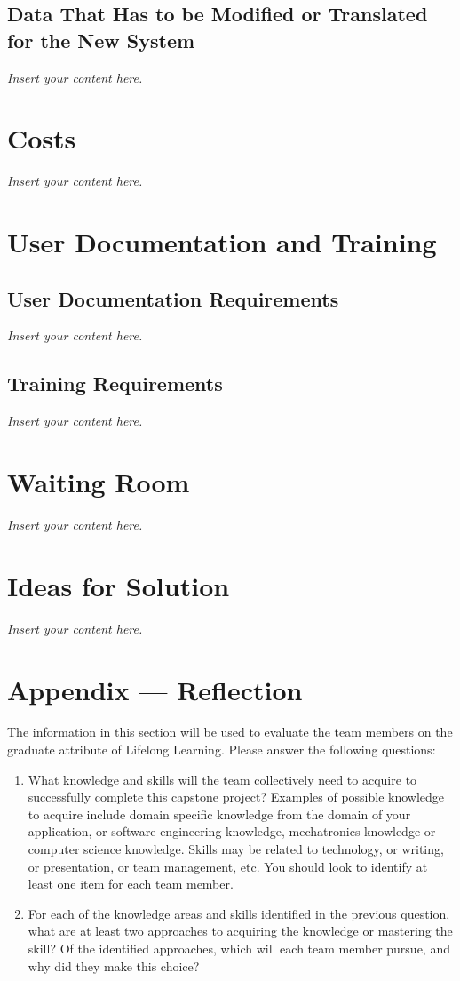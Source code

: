 \documentclass[12pt]{article}
\newcommand{\lips}{\textit{Insert your content here.}}
\begin{document}
\subsection{Data That Has to be Modified or Translated for the New System}
\lips

\section{Costs}
\lips
\section{User Documentation and Training}
\subsection{User Documentation Requirements}
\lips
\subsection{Training Requirements}
\lips

\section{Waiting Room}
\lips

\section{Ideas for Solution}
\lips

\newpage{}
\section*{Appendix --- Reflection}

The information in this section will be used to evaluate the team members on the
graduate attribute of Lifelong Learning.  Please answer the following questions:

\begin{enumerate}
  \item What knowledge and skills will the team collectively need to acquire to
  successfully complete this capstone project?  Examples of possible knowledge
  to acquire include domain specific knowledge from the domain of your
  application, or software engineering knowledge, mechatronics knowledge or
  computer science knowledge.  Skills may be related to technology, or writing,
  or presentation, or team management, etc.  You should look to identify at
  least one item for each team member.
  \item For each of the knowledge areas and skills identified in the previous
  question, what are at least two approaches to acquiring the knowledge or
  mastering the skill?  Of the identified approaches, which will each team
  member pursue, and why did they make this choice?
\end{enumerate}
\end{document}
